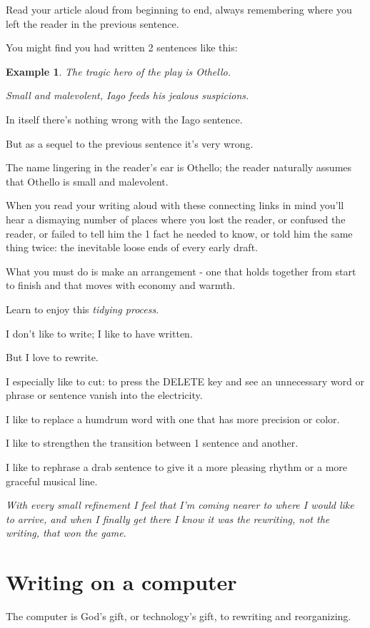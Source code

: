 \documentclass{book}
\numberwithin{equation}{section}
\newtheorem{example}{Example}[chapter]
\begin{document}
Read your article aloud from beginning to end, always remembering where you left the reader in the previous sentence.

You might find you had written 2 sentences like this:
\begin{example}
    The tragic hero of the play is Othello.
    
    Small and malevolent, Iago feeds his jealous suspicions.
\end{example}
In itself there's nothing wrong with the Iago sentence.

But as a sequel to the previous sentence it's very wrong.

The name lingering in the reader's ear is Othello; the reader naturally assumes that Othello is small and malevolent.

%
When you read your writing aloud with these connecting links in mind you'll hear a dismaying number of places where you lost the reader, or confused the reader, or failed to tell him the 1 fact he needed to know, or told him the same thing twice: the inevitable loose ends of every early draft.

What you must do is make an arrangement - one that holds together from start to finish and that moves with economy and warmth.

%
Learn to enjoy this \textit{tidying process}.

I don't like to write; I like to have written.

But I love to rewrite.

I especially like to cut: to press the DELETE key and see an unnecessary word or phrase or sentence vanish into the electricity.

I like to replace a humdrum word with one that has more precision or color.

I like to strengthen the transition between 1 sentence and another.

I like to rephrase a drab sentence to give it a more pleasing rhythm or a more graceful musical line.

\textit{With every small refinement I feel that I'm coming nearer to where I would like to arrive, and when I finally get there I know it was the rewriting, not the writing, that won the game}.

\section{Writing on a computer}
The computer is God's gift, or technology's gift, to rewriting and reorganizing.
\end{document}
